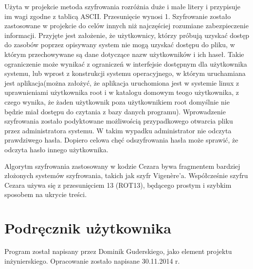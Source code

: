 \documentclass[eng,printmode]{mgr}
\begin{document}
Użyta w projekcie metoda szyfrowania rozróżnia duże i małe litery i przypisuje im wagi zgodne z tablicą ASCII. Przesunięcie wynosi 1. Szyfrowanie zostało zastosowane w projekcie do celów innych niż najczęściej rozumiane zabezpieczenie informacji. Przyjęte jest założenie, że użytkownicy, którzy próbują uzyskać dostęp do zasobów poprzez opisywany system nie mogą uzyskać dostępu do pliku, w którym przechowywane są dane dotyczące nazw użytkowników i ich haseł. Takie ograniczenie może wynikać z ograniczeń w interfejsie dostępnym dla użytkownika systemu, lub wprost z konstrukcji systemu operacyjnego, w którym uruchamiana jest aplikacja(można założyć, że aplikacja uruchomiona jest w systemie linux z uprawnieniami użytkownika root i w katalogu domowym teogo użytkownika, z czego wynika, że żaden użytkownik poza użytkownikiem root domyślnie nie będzie miał dostępu do czytania z bazy danych programu). Wprowadzenie szyfrowania zostało podyktowane możliwością przypadkowego otwarcia pliku przez administratora systemu. W takim wypadku administrator nie odczyta prawdziwego hasła. Dopiero celowa chęć odszyfrowania hasła może sprawić, że odczyta hasło innego użytkownika.

Algorytm szyfrowania zastosowany w kodzie Cezara bywa fragmentem bardziej złożonych systemów szyfrowania, takich jak szyfr Vigenère'a. Współcześnie szyfru Cezara używa się z przesunięciem 13 (ROT13), będącego prostym i szybkim sposobem na ukrycie treści.

\section{Podręcznik użytkownika}
Program został napisany przez Dominik Guderskiego, jako element projektu inżynierskiego. Opracowanie zostało napisane 30.11.2014 r.
\end{document}
